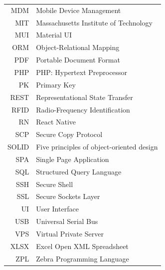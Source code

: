 \documentclass[czech,bachelor,oneside]{ctufit-thesis}
\begin{document}
\begin{tabular}{rl}
	MDM    & Mobile Device Management                        \\
	MIT    & Massachusetts Institute of Technology            \\
	MUI    & Material UI                                     \\
	ORM    & Object-Relational Mapping                       \\
	PDF    & Portable Document Format                        \\
	PHP    & PHP: Hypertext Preprocessor                     \\
	PK     & Primary Key                                     \\
	REST   & Representational State Transfer                 \\
	RFID   & Radio-Frequency Identification                  \\
	RN     & React Native                                    \\
	SCP    & Secure Copy Protocol                            \\
	SOLID  & Five principles of object-oriented design                                    \\
	SPA    & Single Page Application                         \\
	SQL    & Structured Query Language                       \\
	SSH    & Secure Shell                                    \\
	SSL    & Secure Sockets Layer                            \\
	UI     & User Interface                                  \\
	USB    & Universal Serial Bus                            \\
	VPS    & Virtual Private Server                          \\
	XLSX   & Excel Open XML Spreadsheet                      \\
	ZPL    & Zebra Programming Language
\end{tabular}
\resumeTOCentries
\mainmatter\mainmatterinit %


\appendix\appendixinit %


\backmatter %

\printbibliography[heading=bibintoc] %

\end{document}
